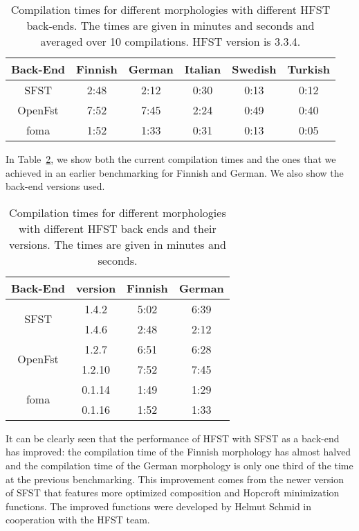 \documentclass{llncs}
\begin{document}
\begin{table} [h!]
  \centering
  \caption{Compilation times for different morphologies with
    different HFST back-ends. The times are given in minutes and seconds
    and averaged over 10 compilations. HFST version is 3.3.4.}
  \begin{tabular}{| c | c | c | c | c | c |}
    \hline
    Back-End & Finnish & German & Italian & Swedish & Turkish \\ \hline\hline
    SFST & 2:48 & 2:12 & 0:30 & 0:13 & 0:12 \\ \hline
    OpenFst & 7:52 & 7:45 & 2:24 & 0:49 & 0:40 \\ \hline
    foma & 1:52 & 1:33 & 0:31 & 0:13 & 0:05 \\ \hline
  \end{tabular}
  \label{tab:compilation_times}
\end{table}


In Table~\ref{tab:compilation_times_versions}, we show both the current compilation 
times and the ones that we achieved in an earlier benchmarking \cite{linden/2011/sfcm} for 
Finnish and German. We also show the back-end versions used.

\begin{table} [h!]
  \centering
  \caption{Compilation times for different morphologies with
    different HFST back ends and their versions. 
    The times are given in minutes and seconds.}
  \begin{tabular}{| c | c | c | c |}
    \hline
    Back-End                 & version  & Finnish  & German \\ \hline\hline
    \multirow{2}{*}{SFST}    & 1.4.2    & 5:02     & 6:39 \\
    & 1.4.6    & 2:48     & 2:12 \\ \hline
    \multirow{2}{*}{OpenFst} & 1.2.7    & 6:51     & 6:28 \\
    & 1.2.10   & 7:52     & 7:45 \\ \hline
    \multirow{2}{*}{foma}    & 0.1.14   & 1:49     & 1:29 \\
    & 0.1.16   & 1:52     & 1:33 \\
    \hline
  \end{tabular}
  \label{tab:compilation_times_versions}
\end{table}

It can be clearly seen that the performance of HFST with SFST as a back-end 
has improved: the compilation time of the Finnish morphology has almost
halved and the compilation time of the German morphology is only one third of the
time at the previous benchmarking. 
This improvement comes from the newer version of SFST that features more optimized
composition and Hopcroft minimization functions. The improved functions 
were developed by Helmut Schmid in cooperation with the HFST team.
\end{document}
